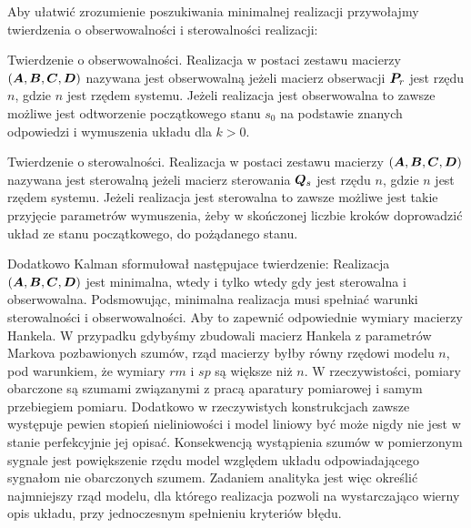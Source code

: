 Aby ułatwić zrozumienie poszukiwania minimalnej realizacji przywołajmy twierdzenia o obserwowalności i sterowalności realizacji:

Twierdzenie o obserwowalności. Realizacja w postaci zestawu macierzy $(\bm{A},\bm{B},\bm{C},\bm{D})$ nazywana jest obserwowalną jeżeli macierz obserwacji $\bm{P}_r$ jest rzędu $n$, gdzie $n$ jest rzędem systemu. Jeżeli realizacja jest obserwowalna to zawsze możliwe jest odtworzenie początkowego stanu $s_0$ na podstawie znanych odpowiedzi i wymuszenia układu dla $k>0$.

Twierdzenie o sterowalności. Realizacja w postaci zestawu macierzy $(\bm{A},\bm{B},\bm{C},\bm{D})$ nazywana jest sterowalną jeżeli macierz sterowania $\bm{Q}_s$ jest rzędu $n$, gdzie $n$ jest rzędem systemu. Jeżeli realizacja jest sterowalna to zawsze możliwe jest takie przyjęcie parametrów wymuszenia, żeby w skończonej liczbie kroków doprowadzić układ ze stanu początkowego, do pożądanego stanu.

Dodatkowo Kalman sformułował następujace twierdzenie: Realizacja $(\bm{A},\bm{B},\bm{C},\bm{D})$ jest minimalna, wtedy i tylko wtedy gdy jest sterowalna i obserwowalna.
Podsmowując, minimalna realizacja musi spełniać warunki sterowalności i obserwowalności. Aby to zapewnić odpowiednie wymiary macierzy Hankela. W przypadku gdybyśmy zbudowali macierz Hankela z parametrów Markova pozbawionych szumów, rząd macierzy byłby równy rzędowi modelu $n$, pod warunkiem, że wymiary $rm$ i $sp$ są większe niż $n$. W rzeczywistości, pomiary obarczone są szumami związanymi z pracą aparatury pomiarowej i samym przebiegiem pomiaru. Dodatkowo w rzeczywistych konstrukcjach zawsze występuje pewien stopień nieliniowości i model liniowy być może nigdy nie jest w stanie perfekcyjnie jej opisać. Konsekwencją wystąpienia szumów w pomierzonym sygnale jest powiększenie rzędu model względem układu odpowiadającego sygnałom nie obarczonych szumem. Zadaniem analityka jest więc określić najmniejszy rząd modelu, dla którego realizacja pozwoli na wystarczająco wierny opis układu, przy jednoczesnym spełnieniu kryteriów błędu.

